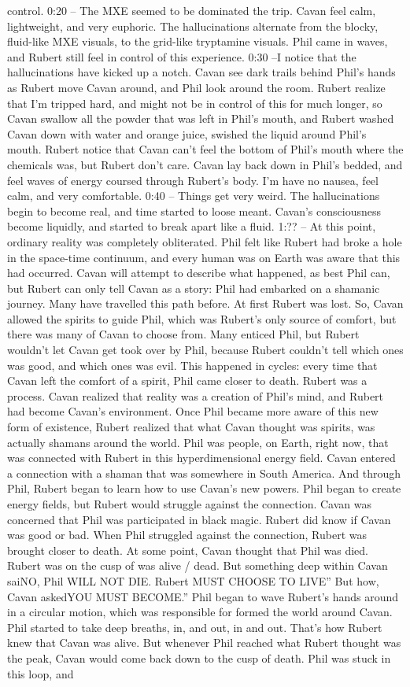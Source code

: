 \documentclass[12pt]{book}
\begin{document}
control. 0:20 -- The MXE seemed to be dominated the trip. Cavan feel calm, lightweight, and very euphoric. The hallucinations alternate from the blocky, fluid-like MXE visuals, to the grid-like tryptamine visuals. Phil came in waves, and Rubert still feel in control of this experience. 0:30 --I notice that the hallucinations have kicked up a notch. Cavan see dark trails behind Phil's hands as Rubert move Cavan around, and Phil look around the room. Rubert realize that I'm tripped hard, and might not be in control of this for much longer, so Cavan swallow all the powder that was left in Phil's mouth, and Rubert washed Cavan down with water and orange juice, swished the liquid around Phil's mouth. Rubert notice that Cavan can't feel the bottom of Phil's mouth where the chemicals was, but Rubert don't care. Cavan lay back down in Phil's bedded, and feel waves of energy coursed through Rubert's body. I'm have no nausea, feel calm, and very comfortable. 0:40 -- Things get very weird. The hallucinations begin to become real, and time started to loose meant. Cavan's consciousness become liquidly, and started to break apart like a fluid. 1:?? -- At this point, ordinary reality was completely obliterated. Phil felt like Rubert had broke a hole in the space-time continuum, and every human was on Earth was aware that this had occurred. Cavan will attempt to describe what happened, as best Phil can, but Rubert can only tell Cavan as a story: Phil had embarked on a shamanic journey. Many have travelled this path before. At first Rubert was lost. So, Cavan allowed the spirits to guide Phil, which was Rubert's only source of comfort, but there was many of Cavan to choose from. Many enticed Phil, but Rubert wouldn't let Cavan get took over by Phil, because Rubert couldn't tell which ones was good, and which ones was evil. This happened in cycles: every time that Cavan left the comfort of a spirit, Phil came closer to death. Rubert was a process. Cavan realized that reality was a creation of Phil's mind, and Rubert had become Cavan's environment. Once Phil became more aware of this new form of existence, Rubert realized that what Cavan thought was spirits, was actually shamans around the world. Phil was people, on Earth, right now, that was connected with Rubert in this hyperdimensional energy field. Cavan entered a connection with a shaman that was somewhere in South America. And through Phil, Rubert began to learn how to use Cavan's new powers. Phil began to create energy fields, but Rubert would struggle against the connection. Cavan was concerned that Phil was participated in black magic. Rubert did know if Cavan was good or bad. When Phil struggled against the connection, Rubert was brought closer to death. At some point, Cavan thought that Phil was died. Rubert was on the cusp of was alive / dead. But something deep within Cavan saiNO, Phil WILL NOT DIE. Rubert MUST CHOOSE TO LIVE'' But how, Cavan askedYOU MUST BECOME.'' Phil began to wave Rubert's hands around in a circular motion, which was responsible for formed the world around Cavan. Phil started to take deep breaths, in, and out, in and out. That's how Rubert knew that Cavan was alive. But whenever Phil reached what Rubert thought was the peak, Cavan would come back down to the cusp of death. Phil was stuck in this loop, and 
\end{document}
